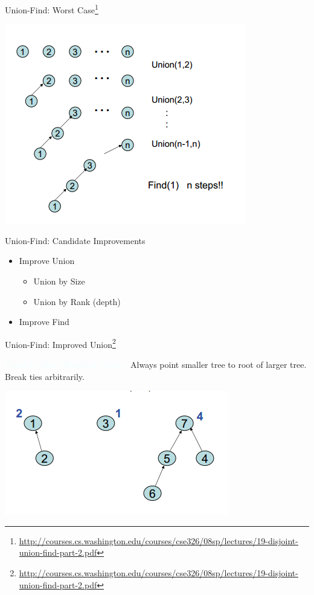 \documentclass{beamer}
\newcommand{\tblue}[1]{{\Large {\textcolor{azure}{#1}}}}
\begin{document}
\begin{frame}{Union-Find: Worst Case\footnote{\url{http://courses.cs.washington.edu/courses/cse326/08sp/lectures/19-disjoint-union-find-part-2.pdf}} }
    \begin{center}
        \includegraphics[scale=0.5]{unionFindWorstCase.png} 
    \end{center}
\end{frame}


\begin{frame}{Union-Find: Candidate Improvements}
    \begin{itemize}
        \item \pause Improve Union
        \begin{itemize}
            \item Union by Size
            \item Union by Rank (depth)
        \end{itemize}
        \item Improve Find
    \end{itemize}
\end{frame}


\begin{frame}{Union-Find: Improved Union\footnote{\url{http://courses.cs.washington.edu/courses/cse326/08sp/lectures/19-disjoint-union-find-part-2.pdf}}}

\tblue{Union by Size (Weighted Union):} Always point smaller tree to root of larger tree. Break ties arbitrarily.
    \begin{center}
        \includegraphics[scale=0.5]{unionByRank.png} 
    \end{center}
\end{frame}
\end{document}
